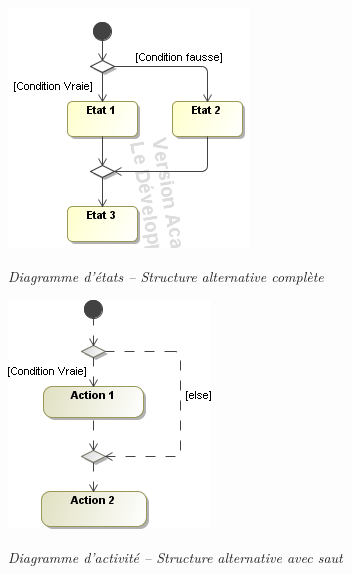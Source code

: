 \documentclass[10pt,fleqn]{article} %
\begin{document}
\begin{minipage}[c]{.48\linewidth}
\begin{center}
\includegraphics[width=.8\textwidth]{images/Condition_stm}

\textit{Diagramme d'états -- Structure alternative complète}
\end{center}
\end{minipage} \hfill
\begin{minipage}[c]{.48\linewidth}
\begin{center}
\includegraphics[width=.6\textwidth]{images/Condition_act}

\textit{Diagramme d'activité -- Structure alternative avec saut}
\end{center}
\end{minipage}
\end{document}
